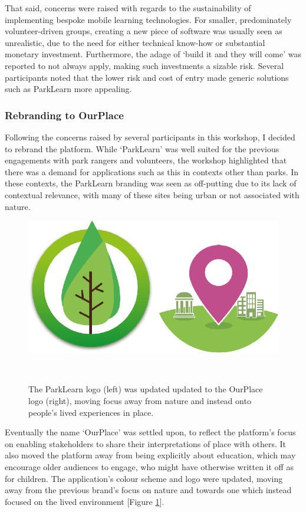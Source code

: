 That said, concerns were raised with regards to the sustainability of implementing bespoke mobile learning technologies. For smaller, predominately volunteer-driven groups, creating a new piece of software was usually seen as unrealistic, due to the need for either technical know-how or substantial monetary investment. Furthermore, the adage of `build it and they will come' was reported to not always apply, making such investments a sizable risk. Several participants noted that the lower risk and cost of entry made generic solutions such as ParkLearn more appealing.

\subsubsection{Rebranding to OurPlace}
Following the concerns raised by several participants in this workshop, I decided to rebrand the platform. While `ParkLearn' was well suited for the previous engagements with park rangers and volunteers, the workshop highlighted that there was a demand for applications such as this in contexts other than parks. In these contexts, the ParkLearn branding was seen as off-putting due to its lack of contextual relevance, with many of these sites being urban or not associated with nature. 

\begin{figure}
  \centering
  \includegraphics[width=0.8\columnwidth]{images/chapter06/logos.png}
  \caption[The ParkLearn and OurPlace Logos]{The ParkLearn logo (left) was updated updated to the OurPlace logo (right), moving focus away from nature and instead onto people's lived experiences in place.}~\label{fig:AppLogos}
\end{figure}

Eventually the name `OurPlace' was settled upon, to reflect the platform's focus on enabling stakeholders to share their interpretations of place with others. It also moved the platform away from being explicitly about education, which may encourage older audiences to engage, who might have otherwise written it off as for children. The application's colour scheme and logo were updated, moving away from the previous brand's focus on nature and towards one which instead focused on the lived environment [Figure \ref{fig:AppLogos}].

